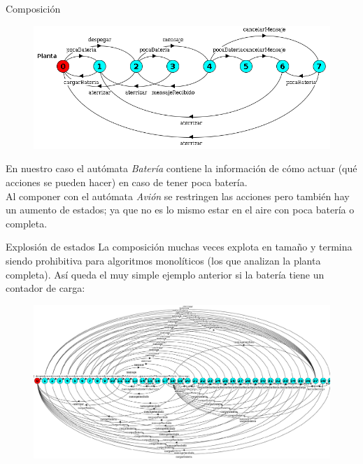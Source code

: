 \begin{frame}{Composición}
    \begin{figure}
     \includegraphics[width=\textwidth]{figures/planta.png}
    \end{figure}
    En nuestro caso el autómata \textit{Batería} contiene la información de cómo actuar (qué acciones se pueden hacer) en caso de tener poca batería.\\ 
    Al componer con el autómata \textit{Avión} se restringen las acciones pero también hay un aumento de estados; ya que no es lo mismo estar en el aire con poca batería o completa.
\end{frame}
\begin{frame}{Explosión de estados}
    La composición muchas veces explota en tamaño y termina siendo prohibitiva para algoritmos monolíticos (los que analizan la planta completa). Así queda el muy simple ejemplo anterior si la batería tiene un contador de carga:
    \begin{figure}
    	\includegraphics[width=\textwidth]{figures/big-plant.png}
    \end{figure}
\end{frame}
